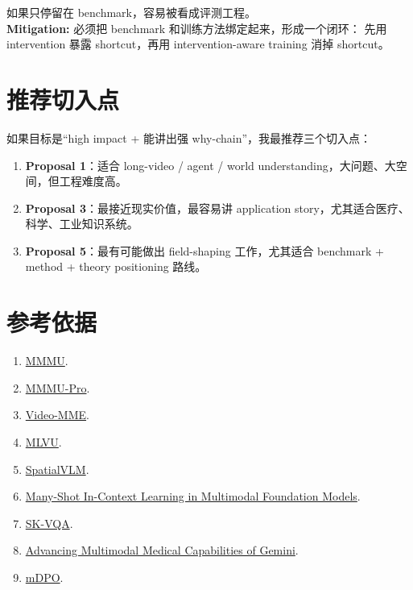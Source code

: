 \documentclass[12pt,a4paper]{article}
\begin{document}
\begin{riskbox}
如果只停留在 benchmark，容易被看成评测工程。\\
\textbf{Mitigation:}
必须把 benchmark 和训练方法绑定起来，形成一个闭环：
先用 intervention 暴露 shortcut，再用 intervention-aware training 消掉 shortcut。
\end{riskbox}

\section*{推荐切入点}

如果目标是``high impact + 能讲出强 why-chain''，我最推荐三个切入点：
\begin{enumerate}[leftmargin=2em]
  \item \textbf{Proposal 1}：适合 long-video / agent / world understanding，大问题、大空间，但工程难度高。
  \item \textbf{Proposal 3}：最接近现实价值，最容易讲 application story，尤其适合医疗、科学、工业知识系统。
  \item \textbf{Proposal 5}：最有可能做出 field-shaping 工作，尤其适合 benchmark + method + theory positioning 路线。
\end{enumerate}

\section*{参考依据}

\begin{enumerate}[leftmargin=2em]
  \item \href{https://arxiv.org/abs/2311.16502}{MMMU}.
  \item \href{https://arxiv.org/abs/2409.02813}{MMMU-Pro}.
  \item \href{https://arxiv.org/abs/2405.21075}{Video-MME}.
  \item \href{https://arxiv.org/abs/2406.04264}{MLVU}.
  \item \href{https://arxiv.org/abs/2401.12168}{SpatialVLM}.
  \item \href{https://arxiv.org/abs/2405.09798}{Many-Shot In-Context Learning in Multimodal Foundation Models}.
  \item \href{https://arxiv.org/abs/2406.19593}{SK-VQA}.
  \item \href{https://arxiv.org/abs/2405.03162}{Advancing Multimodal Medical Capabilities of Gemini}.
  \item \href{https://arxiv.org/abs/2406.11839}{mDPO}.
\end{enumerate}
\end{document}
